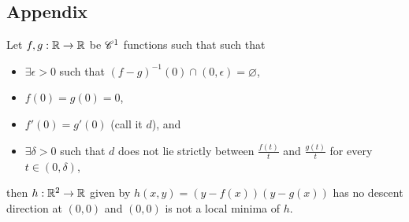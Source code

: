 \subsection*{Appendix}\label{sec3app}
\begin{thm}\label{gen3}
Let $f,g:\mathbb{R}\to \mathbb{R}$ be ${\mathscr{C}}^1$ functions such that  such that \begin{itemize}
\item $\exists\epsilon>0$ such that $(f-g)^{-1}(0)\cap (0,\epsilon)=\varnothing$,
\item $f(0)=g(0)=0$, 
\item $f'(0)=g'(0)$ (call it $d$), and
\item $\exists \delta > 0$ such that $d$ does not lie strictly between $\frac{f(t)}{t}$ and $\frac{g(t)}{t}$ for every $t\in(0,\delta)$,
\end{itemize}
then $h:\mathbb{R}^2\to\mathbb{R}$ given by $h(x,y) = (y-f(x))(y-g(x))$ has no descent direction at $(0,0)$ and $(0,0)$ is not a local minima of $h$.
\end{thm}

